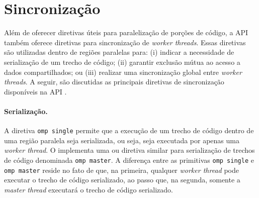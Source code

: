 \documentclass{SBCbookchapter}
\begin{document}
\section{Sincronização}
\label{section: sincronizacao}

	Além de oferecer diretivas úteis para paralelização de porções de
	código, a API \openmp também oferece diretivas para sincronização de
	\textit{worker threads}. Essas diretivas são utilizadas dentro de
	regiões paralelas para: (i) indicar a necessidade de serialização de
	um trecho de código; (ii) garantir exclusão mútua ao acesso a dados
	compartilhados; ou (iii) realizar uma sincronização global entre
	\textit{worker threads}. A seguir, são discutidas as principais
	diretivas de sincronização disponíveis na API \openmp.

		\paragraph{Serialização.} A diretiva \texttt{omp single} permite
		que a execução de um trecho de código dentro de uma região
		paralela seja serializada, ou seja, seja executada por apenas
		uma \textit{worker thread}. O \openmp implementa uma ou diretiva
		similar para serialização de trechos de código denominada
		\texttt{omp master}. A diferença entre as primitivas \texttt{omp
		single} e \texttt{omp master} reside no fato de que, na
		primeira, qualquer \textit{worker thread} pode executar o trecho
		de código serializado, ao passo que, na segunda, somente a
		\textit{master thread} executará o trecho de código serializado.
		
\end{document}
